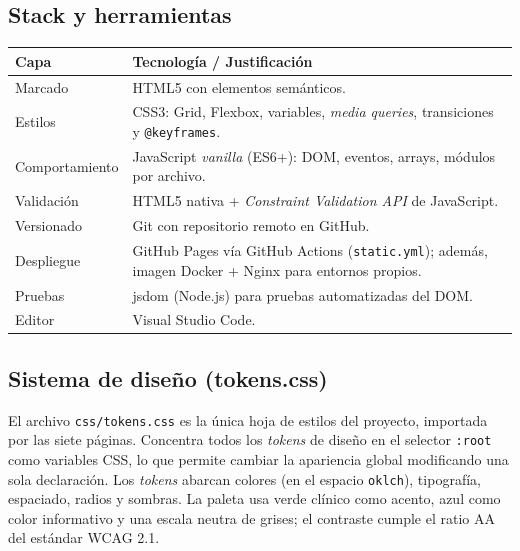 \documentclass[11pt,a4paper]{article}
\newcommand{\thead}[1]{\textbf{\color{white}#1}}
\newcommand{\hrow}{\rowcolor{navy}}
\begin{document}
\subsection{Stack y herramientas}
\begin{center}
\begin{tabularx}{\textwidth}{l Y}
\hrow \thead{Capa} & \thead{Tecnología / Justificación} \\
\midrule
Marcado & HTML5 con elementos semánticos. \\
Estilos & CSS3: Grid, Flexbox, variables, \emph{media queries}, transiciones y \lstinline|@keyframes|. \\
Comportamiento & JavaScript \emph{vanilla} (ES6+): DOM, eventos, arrays, módulos por archivo. \\
Validación & HTML5 nativa + \emph{Constraint Validation API} de JavaScript. \\
Versionado & Git con repositorio remoto en GitHub. \\
Despliegue & GitHub Pages vía GitHub Actions (\texttt{static.yml}); además, imagen Docker + Nginx para entornos propios. \\
Pruebas & jsdom (Node.js) para pruebas automatizadas del DOM. \\
Editor & Visual Studio Code. \\
\bottomrule
\end{tabularx}
\end{center}

\subsection{Sistema de diseño (tokens.css)}
El archivo \texttt{css/tokens.css} es la única hoja de estilos del proyecto, importada por las siete páginas. Concentra todos los \emph{tokens} de diseño en el selector \lstinline|:root| como variables CSS, lo que permite cambiar la apariencia global modificando una sola declaración. Los \emph{tokens} abarcan colores (en el espacio \lstinline|oklch|), tipografía, espaciado, radios y sombras. La paleta usa verde clínico como acento, azul como color informativo y una escala neutra de grises; el contraste cumple el ratio AA del estándar WCAG 2.1.
\end{document}

